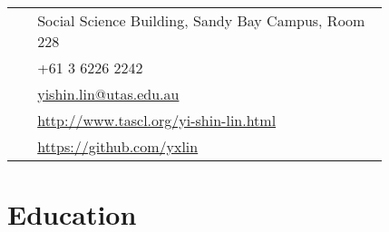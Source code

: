 \documentclass[10pt]{article} %
\begin{document}
\begin{paracol}{2}
\parbox[top][0.12\textheight][c]{\linewidth}{ %
	\vspace{-0.04\textheight} %
	\colorbox{shade}{ %
		\begin{supertabular}{p{0.05\linewidth}|p{0.775\linewidth}} %
			\raisebox{-1pt}{\faHome} & Social Science Building, Sandy Bay Campus, Room 228 \\ %
			\raisebox{-1pt}{\faPhone} & +61 3 6226 2242 \\ %
			\raisebox{0pt}{\small\faEnvelope} & \href{mailto:yishin.lin@utas.edu.au}{yishin.lin@utas.edu.au} \\ %
			\raisebox{-1pt}{\small\faDesktop} & \href{http://www.tascl.org/yi-shin-lin.html}{http://www.tascl.org/yi-shin-lin.html} \\ %
			\raisebox{-1pt}{\faGithub} & \href{https://github.com/yxlin}{https://github.com/yxlin} \\ %
		\end{supertabular}
	}
}


\section{Education} 





\begin{supertabular}{rl} %


\end{supertabular}
\end{paracol}
\end{document}
